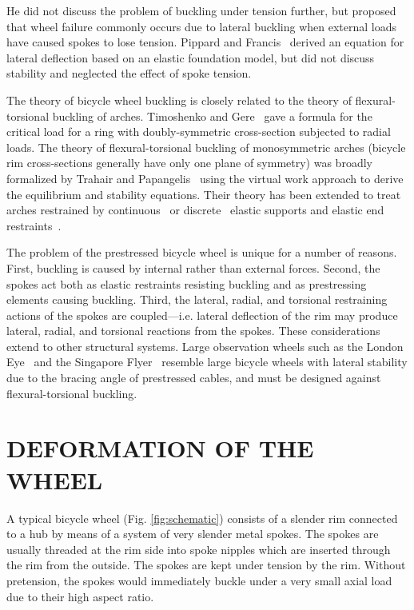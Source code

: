 \documentclass{bmd2016p}
\begin{document}
He did not discuss the problem of buckling under tension further, but proposed that wheel failure commonly occurs due to lateral buckling when external loads have caused spokes to lose tension. Pippard and Francis~\cite{Pippard1932d} derived an equation for lateral deflection based on an elastic foundation model, but did not discuss stability and neglected the effect of spoke tension.

The theory of bicycle wheel buckling is closely related to the theory of flexural-torsional buckling of arches. Timoshenko and Gere~\cite{Timoshenko1961a} gave a formula for the critical load for a ring with doubly-symmetric cross-section subjected to radial loads. The theory of flexural-torsional buckling of monosymmetric arches (bicycle rim cross-sections generally have only one plane of symmetry) was broadly formalized by Trahair and Papangelis~\cite{Trahair1987b} using the virtual work approach to derive the equilibrium and stability equations. Their theory has been extended to treat arches restrained by continuous~\cite{Pi2002b} or discrete~\cite{Bradford2002d} elastic supports and elastic end restraints~\cite{Guo2014b}.

The problem of the prestressed bicycle wheel is unique for a number of reasons. First, buckling is caused by internal rather than external forces. Second, the spokes act both as elastic restraints resisting buckling and as prestressing elements causing buckling. Third, the lateral, radial, and torsional restraining actions of the spokes are coupled---i.e. lateral deflection of the rim may produce lateral, radial, and torsional reactions from the spokes. These considerations extend to other structural systems. Large observation wheels such as the London Eye~\cite{Mann2001a} and the Singapore Flyer~\cite{Allsop2009a} resemble large bicycle wheels with lateral stability due to the bracing angle of prestressed cables, and must be designed against flexural-torsional buckling.



\section{DEFORMATION OF THE WHEEL}
A typical bicycle wheel (Fig. \ref{fig:schematic}) consists of a slender rim connected to a hub by means of a system of very slender metal spokes. The spokes are usually threaded at the rim side into spoke nipples which are inserted through the rim from the outside. The spokes are kept under tension by the rim. Without pretension, the spokes would immediately buckle under a very small axial load due to their high aspect ratio.
\end{document}
